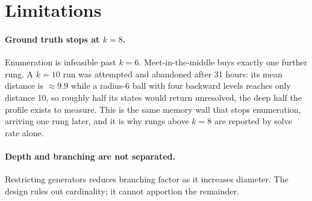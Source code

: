 \documentclass{article}
\begin{document}
\begin{table}[t]\centering
\caption{Solve rate (\%) across 21 orders of magnitude of state space, three seeds
per cell, mean\,$\pm$\,sd. Branching factor, encoding, architecture and budget are
identical throughout. Note that variance peaks in the transition region.}
\label{tab:ladder}\end{table}



\section{Limitations}
\label{sec:limits}

\paragraph{Ground truth stops at $k=8$.} Enumeration is infeasible past $k=6$.
Meet-in-the-middle buys exactly one further rung. A $k=10$ run was attempted and
abandoned after 31 hours: its mean distance is $\approx9.9$ while a radius-6 ball
with four backward levels reaches only distance 10, so roughly half its states
would return unresolved, the deep half the profile exists to measure. This is
the same memory wall that stops enumeration, arriving one rung later, and it is
why rungs above $k=8$ are reported by solve rate alone.

\paragraph{Depth and branching are not separated.} Restricting generators reduces
branching factor as it increases diameter. The design rules out cardinality; it
cannot apportion the remainder.
\end{document}

